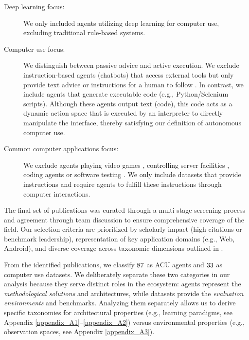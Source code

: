 \begin{description}
    \item[Deep learning focus:]
        We only included agents utilizing deep learning for computer use, excluding traditional rule-based systems.
    \item[Computer use focus:]
        We distinguish between passive advice and active execution. We exclude instruction-based agents (chatbots) that access external tools but only provide text advice or instructions for a human to follow . 
        In contrast, we include agents that generate executable code (e.g., Python/Selenium scripts). Although these agents output text (code), this code acts as a dynamic action space that is executed by an interpreter to directly manipulate the interface, thereby satisfying our definition of autonomous computer use.
    \item[Common computer applications focus:]
        We exclude agents playing video games , controlling server facilities , coding agents  or software testing .
        We only include datasets that provide instructions and require agents to fulfill these instructions through computer interactions.
\end{description}

The final set of publications was curated through a multi-stage screening process and agreement through team discussion to ensure comprehensive coverage of the field. Our selection criteria are prioritized by scholarly impact (high citations or benchmark leadership), representation of key application domains (e.g., Web, Android), and diverse coverage across taxonomic dimensions outlined in .

From the identified publications, we classify $87$ as ACU agents and $33$ as computer use datasets. We deliberately separate these two categories in our analysis because they serve distinct roles in the ecosystem: agents represent the \textit{methodological solutions} and architectures, while datasets provide the \textit{evaluation environments} and benchmarks. Analyzing them separately allows us to derive specific taxonomies for architectural properties (e.g., learning paradigms, see Appendix \ref{appendix_A1}--\ref{appendix_A2}) versus environmental properties (e.g., observation spaces, see Appendix \ref{appendix_A3}).

